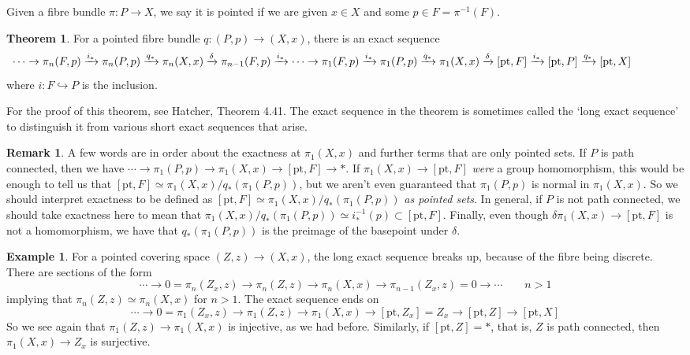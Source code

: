 \documentclass{tufte-handout}
\def\into {\hookrightarrow}
\def\pt {\mathrm{pt}}
\theoremstyle{definition}
\newtheorem{example}{Example}
\newtheorem{theorem}{Theorem}
\newtheorem*{rem}{Remark}
\begin{document}
Given a fibre bundle $\pi\colon P\to X$, we say it is pointed if we are given $x\in X$ and some $p\in F = \pi^{-1}(F)$.

\begin{theorem}
For a pointed fibre bundle $q\colon (P,p) \to (X,x)$, there is an exact sequence
\[
\hspace{-1.5cm}\cdots \to \pi_n(F,p) \xrightarrow{i_*} \pi_n(P,p) \xrightarrow{q_*}\pi_n(X,x) \xrightarrow{\delta} \pi_{n-1}(F,p) \xrightarrow{i_*} \cdots \to \pi_1(F,p) \xrightarrow{i_*} \pi_1(P,p) \xrightarrow{q_*} \pi_1(X,x) \xrightarrow{\delta}  [\pt,F] \xrightarrow{i_*} [\pt,P] \xrightarrow{q_*} [\pt,X]
\]
where $i\colon F\into P$ is the inclusion.
\end{theorem}

For the proof of this theorem, see Hatcher, Theorem 4.41. The exact sequence in the theorem is sometimes called the `long exact sequence' to distinguish it from various short exact sequences that arise.

\begin{rem}
A few words are in order about the exactness at $\pi_1(X,x)$ and further terms that are only pointed sets. If $P$ is path connected, then we have $\cdots \to \pi_1(P,p)\to \pi_1(X,x) \to [\pt,F] \to *$. If $\pi_1(X,x) \to [\pt,F]$ \emph{were} a group homomorphism, this would be enough to tell us that $[\pt,F] \simeq \pi_1(X,x)/q_*(\pi_1(P,p))$, but we aren't even guaranteed that $\pi_1(P,p)$ is normal in $\pi_1(X,x)$. So we should interpret exactness to be defined as $[\pt,F] \simeq \pi_1(X,x)/q_*(\pi_1(P,p))$ \emph{as pointed sets}. In general, if $P$ is not path connected, we should take exactness here to mean that $\pi_1(X,x)/q_*(\pi_1(P,p))\simeq i_*^{-1}(p)\subset [\pt,F]$. Finally, even though $\delta \pi_1(X,x) \to [\pt,F]$ is not a homomorphism, we have that $q_*(\pi_1(P,p))$ is the preimage of the basepoint under $\delta$.
\end{rem}

\begin{example}
For a pointed covering space $(Z,z)\to (X,x)$, the long exact sequence breaks up, because of the fibre being discrete. There are sections of the form
\[
  \cdots \to 0 = \pi_n(Z_x,z) \to \pi_n(Z,z) \to \pi_n(X,x) \to \pi_{n-1}(Z_x,z) = 0 \to \cdots \qquad n >1
\]
implying that $\pi_n(Z,z) \simeq \pi_n(X,x)$ for $n>1$. The exact sequence ends on
\[
  \cdots \to 0=\pi_1(Z_x,z) \to \pi_1(Z,z) \to \pi_1(X,x) \to [\pt,Z_x] = Z_x \to [\pt,Z]\to [\pt,X]
\]
So we see again that $\pi_1(Z,z) \to \pi_1(X,x)$ is injective, as we had before. Similarly, if $[\pt,Z]=\ast$, that is, $Z$ is path connected, then $\pi_1(X,x) \to Z_x$ is surjective. 
\end{example}
\end{document}
